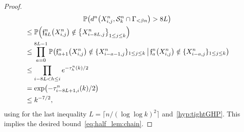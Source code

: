 \documentclass[10pt]{amsart}
\theoremstyle{definition}\newtheorem{defi}[theo]{Definition}\newtheorem{rema}[theo]{Remark}\newtheorem{exam}[theo]{Example}\newtheorem{exem}[theo]{Example}\newtheorem{nota}[theo]{Notation}
\newcommand{\proba}[1]{\mathbb{P}\left(#1\right)}
\newcommand{\1}{\mathbbm{1}}
\newcommand{\fath}{\mathfrak{f}}
\newcommand{\trail}{\mathcal{S}}
\let\originalleft\left
\let\originalright\right
\renewcommand{\left}{\mathopen{}\mathclose\bgroup\originalleft}
\renewcommand{\right}{\aftergroup\egroup\originalright}
\begin{document}
\begin{proof}
\begin{multline*}
\proba{d^n\left(X^n_{i,j},\trail^n_k\cap \Gamma_{<\beta n}\right)>8L}\\
\begin{aligned}
&\leq \proba{\fath^n_{8L}\left(X^n_{i,j}\right)\notin \left\{X^n_{i-8L,j}\right\}_{1\leq j \leq k}}\\
& \le \prod_{a=0}^{8L-1} \proba{\fath^n_{a+1}\left(X^n_{i,j}\right) \notin \{X^n_{i-a-1,j}\}_{1\leq j \leq k} \,\middle|\,\fath^n_{a}\left(X^n_{i,j}\right) \notin \{X^n_{i-a,j}\}_{1\leq j \leq k}}\\
& \leq \prod_{i-8L<h\leq i} e^{-\tau_{h}^n(k)/2}\\
& =\exp \left(-\tau_{i-8L+1,i}^n(k)/2 \right)\\
& \leq k^{-7/2},
\end{aligned}
\end{multline*}
using for the last inequality $L=\lceil n/(\log\log k)^2\rceil$ and~\ref{hyp:tightGHP}. This implies the desired bound~\eqref{eq:half_lem:chain}.
\end{proof}
\end{document}

